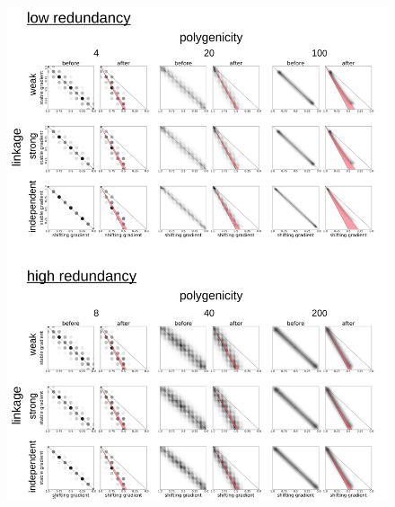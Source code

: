 \documentclass[9pt,twocolumn,twoside,lineno]{pnas-new}
\begin{document}
\begin{figure}
\centering
\includegraphics[width=15.8cm]{pub/figs_and_stats/FIG_4_phenotypic_shift.jpg}

\end{figure}
\end{document}
